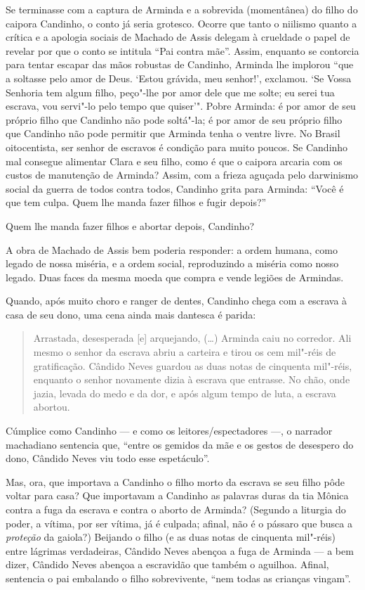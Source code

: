Se terminasse com a captura de Arminda e a sobrevida (momentânea) do
filho do caipora Candinho, o conto já seria grotesco. Ocorre que tanto o
niilismo quanto a crítica e a apologia sociais de Machado de Assis
delegam à crueldade o papel de revelar por que o conto se intitula ``Pai
contra mãe''. Assim, enquanto se contorcia para tentar escapar das mãos
robustas de Candinho, Arminda lhe implorou ``que a soltasse pelo amor de
Deus. `Estou grávida, meu senhor!', exclamou. `Se Vossa Senhoria tem
algum filho, peço"-lhe por amor dele que me solte; eu serei tua escrava,
vou servi"-lo pelo tempo que quiser'". Pobre Arminda: é por amor de seu
próprio filho que Candinho não pode soltá"-la; é por amor de seu próprio
filho que Candinho não pode permitir que Arminda tenha o ventre livre.
No Brasil oitocentista, ser senhor de escravos é condição para muito
poucos. Se Candinho mal consegue alimentar Clara e seu filho, como é que
o caipora arcaria com os custos de manutenção de Arminda? Assim, com a
frieza aguçada pelo darwinismo social da guerra de todos contra todos,
Candinho grita para Arminda: ``Você é que tem culpa. Quem lhe manda
fazer filhos e fugir depois?''

Quem lhe manda fazer filhos e abortar depois, Candinho?

A obra de Machado de Assis bem poderia responder: a ordem humana, como
legado de nossa miséria, e a ordem social, reproduzindo a miséria como
nosso legado. Duas faces da mesma moeda que compra e vende legiões de
Armindas.

Quando, após muito choro e ranger de dentes, Candinho chega com a
escrava à casa de seu dono, uma cena ainda mais dantesca é parida:

\begin{quote}
Arrastada, desesperada {[}e{]} arquejando, (\ldots{}) Arminda caiu no
corredor. Ali mesmo o senhor da escrava abriu a carteira e tirou os cem
mil"-réis de gratificação. Cândido Neves guardou as duas notas de
cinquenta mil"-réis, enquanto o senhor novamente dizia à escrava que
entrasse. No chão, onde jazia, levada do medo e da dor, e após algum
tempo de luta, a escrava abortou.
\end{quote}

Cúmplice como Candinho --- e como os leitores/espectadores
---, o narrador
machadiano sentencia que, ``entre os gemidos da mãe e os gestos de
desespero do dono, Cândido Neves viu todo esse espetáculo''.

Mas, ora, que importava a Candinho o filho morto da escrava se seu filho
pôde voltar para casa? Que importavam a Candinho as palavras duras da
tia Mônica contra a fuga da escrava e contra o aborto de Arminda?
(Segundo a liturgia do poder, a vítima, por ser vítima, já é culpada;
afinal, não é o pássaro que busca a \emph{proteção} da gaiola?) Beijando
o filho (e as duas notas de cinquenta mil"-réis) entre lágrimas
verdadeiras, Cândido Neves abençoa a fuga de Arminda --- a bem dizer,
Cândido Neves abençoa a escravidão que também o aguilhoa. Afinal,
sentencia o pai embalando o filho sobrevivente, ``nem todas as crianças
vingam''.

